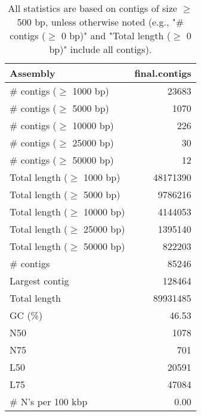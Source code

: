 \documentclass[12pt,a4paper]{article}
\begin{document}
\begin{table}[ht]
\begin{center}
\caption{All statistics are based on contigs of size $\geq$ 500 bp, unless otherwise noted (e.g., "\# contigs ($\geq$ 0 bp)" and "Total length ($\geq$ 0 bp)" include all contigs).}
\begin{tabular}{|l*{1}{|r}|}
\hline
Assembly & final.contigs \\ \hline
\# contigs ($\geq$ 1000 bp) & 23683 \\ \hline
\# contigs ($\geq$ 5000 bp) & 1070 \\ \hline
\# contigs ($\geq$ 10000 bp) & 226 \\ \hline
\# contigs ($\geq$ 25000 bp) & 30 \\ \hline
\# contigs ($\geq$ 50000 bp) & 12 \\ \hline
Total length ($\geq$ 1000 bp) & 48171390 \\ \hline
Total length ($\geq$ 5000 bp) & 9786216 \\ \hline
Total length ($\geq$ 10000 bp) & 4144053 \\ \hline
Total length ($\geq$ 25000 bp) & 1395140 \\ \hline
Total length ($\geq$ 50000 bp) & 822203 \\ \hline
\# contigs & 85246 \\ \hline
Largest contig & 128464 \\ \hline
Total length & 89931485 \\ \hline
GC (\%) & 46.53 \\ \hline
N50 & 1078 \\ \hline
N75 & 701 \\ \hline
L50 & 20591 \\ \hline
L75 & 47084 \\ \hline
\# N's per 100 kbp & 0.00 \\ \hline
\end{tabular}
\end{center}
\end{table}
\end{document}
